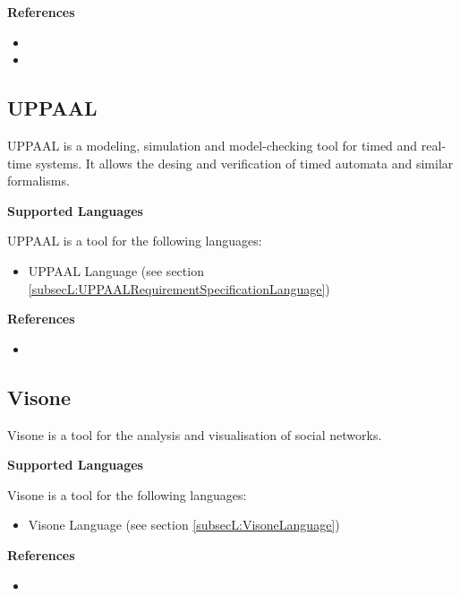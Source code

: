 \textbf{References}
\begin{itemize}
	
\item {}
	
\item {}
\end{itemize}



\subsection{UPPAAL}
\label{subsecT:UPPAAL}


UPPAAL is a modeling, simulation and model-checking tool for timed and real-time systems. It allows the desing and verification of timed automata and similar formalisms.

\textbf{Supported Languages}

UPPAAL is a tool for the following languages:
\begin{itemize}
	\item UPPAAL Language (see section \ref{subsecL:UPPAALRequirementSpecificationLanguage})
\end{itemize}


\textbf{References}
\begin{itemize}
	
\item {}
\end{itemize}



\subsection{Visone}
\label{subsecT:Visone}


Visone is a tool for the analysis and visualisation of social networks.

\textbf{Supported Languages}

Visone is a tool for the following languages:
\begin{itemize}
	\item Visone Language (see section \ref{subsecL:VisoneLanguage})
\end{itemize}


\textbf{References}
\begin{itemize}
	
\item {}
\end{itemize}



